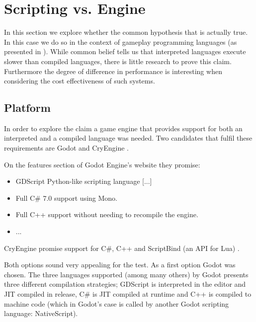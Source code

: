 \section{Scripting vs. Engine}
In this section we explore whether the common hypothesis that \textit{}\cite{IBM:Knowledgebase} is actually true. In this case we do so in the context of gameplay programming languages (as presented in ). While common belief tells us that interpreted languages execute slower than compiled languages, there is little research to prove this claim. Furthermore the degree of difference in performance is interesting when considering the cost effectiveness of such systems.

\subsection{Platform}
In order to explore the claim a game engine that provides support for both an interpreted and a compiled language was needed. Two candidates that fulfil these requirements are Godot and CryEngine \cite{cryengine:home}.

On the features section of Godot Engine's website they promise:
\begin{itemize}
    \item GDScript Python-like scripting language [...]
    \item Full C\# 7.0 support using Mono.
    \item Full C++ support without needing to recompile the engine.
    \item ...
\end{itemize}
CryEngine promise support for C\#, C++ and ScriptBind (an \ac{API} for Lua) \cite{cryengine:languages}.

Both options sound very appealing for the test. As a first option Godot was chosen. The three languages supported (among many others) by Godot presents three different compilation strategies; GDScript is interpreted in the editor and \ac{JIT} compiled in release\cite{locurcio:gdscript}, C\# is \ac{JIT} compiled at runtime and C++ is compiled to machine code (which in Godot's case is called by another Godot scripting language: NativeScript). 

